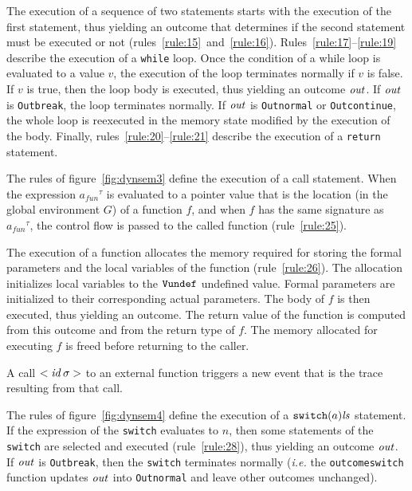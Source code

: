 \documentclass[namedreferences]{kluwer}
\begin{document}
\begin{article}
The execution of a sequence of two statements starts with the
execution of the first statement, thus yielding an outcome that
determines if the second statement must be executed or not
(rules~\ref{rule:15}~and~\ref{rule:16}).
Rules~\ref{rule:17}--\ref{rule:19} describe the execution of a
{\tt while} loop.  Once the condition of a while loop is evaluated to a
value $v$, the execution of the loop terminates normally if $v$ is
false.  If $v$ is true, then the loop body is executed, thus yielding
an outcome $\mathit{out}$.  If $\mathit{out}$ is {\tt Out{}break}, the loop terminates
normally. If $\mathit{out}$ is {\tt Out{}normal} or {\tt Out{}continue}, 
the whole loop is reexecuted in the memory state modified by the execution of the
body.
Finally, rules~\ref{rule:20}--\ref{rule:21} describe the execution of a 
{\tt return} statement.



The rules of figure~\ref{fig:dynsem3} define the execution of a call statement.
When the expression ${a_{fun}}^{\tau}$ is evaluated to a pointer value that is the
location (in the global environment $G$) of a function $f$, and when $f$ has the
same signature as ${a_{fun}}^{\tau}$, the control flow is passed to the called
function (rule~\ref{rule:25}).

The execution of a \Clight{} function allocates the memory required 
for storing the formal parameters and the local variables of the function 
(rule~\ref{rule:26}). The allocation initializes local variables to the 
${\tt Vundef}$ undefined value. Formal parameters are initialized to their 
corresponding actual parameters. The body of $f$ is then executed, thus yielding 
an outcome. The return value of the function is computed from this outcome and 
from the return type of $f$. The memory allocated for executing $f$ is freed
before returning to the caller.

A call $<\mathit{id} \, \sigma>$ to an external function triggers a new event
that is the trace resulting from that call.



The rules of figure~\ref{fig:dynsem4} define the execution of a 
${\tt switch}(a) \it ls$ statement. If the expression of the {\tt switch} evaluates
to $n$, then some statements of the {\tt switch} are selected and executed 
(rule~\ref{rule:28}), thus yielding an outcome $\mathit{out}$. If $\mathit{out}$ is 
{\tt Out{}break}, then the {\tt switch} terminates normally 
(\textit{i.e.} the {\tt outcome{}switch} function updates $\mathit{out}$ into 
{\tt Out{}normal} and leave other outcomes unchanged).


\end{article}
\end{document}
